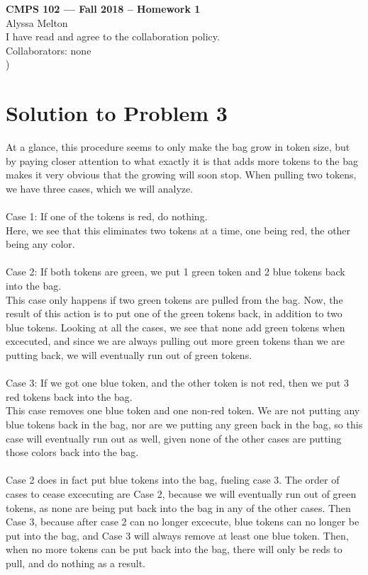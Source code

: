 \documentclass[11pt]{article}
\begin{document}
	
	\begin{center}
		{\bf\Large CMPS 102 --- Fall 2018 --  Homework 1}\\
		Alyssa Melton\\
		I have read and agree to the collaboration policy. \\
		Collaborators: none\\\right) 
	\end{center}
	
	
	\section*{Solution to Problem 3}
	
	At a glance, this procedure seems to only make the bag grow in token size, but by paying closer attention to what exactly it is that adds more tokens to the bag makes it very obvious that the growing will soon stop. When pulling two tokens, we have three cases, which we will analyze. \\
	\\
	Case 1: If one of the tokens is red, do nothing.\\
	Here, we see that this eliminates two tokens at a time, one being red, the other being any color.\\
	\\
	Case 2: If both tokens are green, we put 1 green token and 2 blue tokens back into the bag.\\
	This case only happens if two green tokens are pulled from the bag. Now, the result of this action is to put one of the green tokens back, in addition to two blue tokens. Looking at all the cases, we see that none add green tokens when excecuted, and since we are always pulling out more green tokens than we are putting back, we will eventually run out of green tokens.\\
	\\
	Case 3: If we got one blue token, and the other token is not red, then we put 3 red tokens back into the bag.\\
	This case removes one blue token and one non-red token. We are not putting any blue tokens back in the bag, nor are we putting any green back in the bag, so this case will eventually run out as well, given none of the other cases are putting those colors back into the bag. \\
	\\
	Case 2 does in fact put blue tokens into the bag, fueling case 3. The order of cases to cease excecuting are Case 2, because we will eventually run out of green tokens, as none are being put back into the bag in any of the other cases. Then Case 3, because after case 2 can no longer excecute, blue tokens can no longer be put into the bag, and Case 3 will always remove at least one blue token. Then, when no more tokens can be put back into the bag, there will only be reds to pull, and do nothing as a result.
\end{document}
